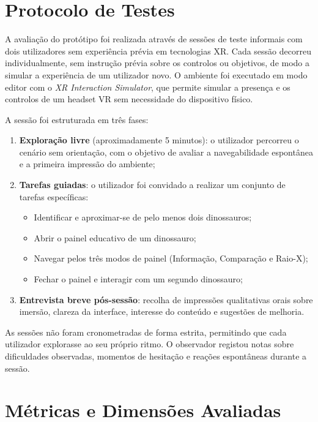 \documentclass[a4paper,11pt]{report}
\begin{document}
\section{Protocolo de Testes}

A avaliação do protótipo foi realizada através de sessões de teste informais
com dois utilizadores sem experiência prévia em tecnologias XR. Cada sessão
decorreu individualmente, sem instrução prévia sobre os controlos ou objetivos,
de modo a simular a experiência de um utilizador novo. O ambiente foi executado
em modo editor com o \textit{XR Interaction Simulator}, que permite simular
a presença e os controlos de um headset VR sem necessidade do dispositivo físico.

A sessão foi estruturada em três fases:

\begin{enumerate}
    \setlength\itemsep{0pt}
    \item \textbf{Exploração livre} (aproximadamente 5 minutos): o utilizador
          percorreu o cenário sem orientação, com o objetivo de avaliar a
          navegabilidade espontânea e a primeira impressão do ambiente;
    \item \textbf{Tarefas guiadas}: o utilizador foi convidado a realizar
          um conjunto de tarefas específicas:
          \begin{itemize}
              \setlength\itemsep{0pt}
              \item Identificar e aproximar-se de pelo menos dois dinossauros;
              \item Abrir o painel educativo de um dinossauro;
              \item Navegar pelos três modos de painel (Informação, Comparação
                    e Raio-X);
              \item Fechar o painel e interagir com um segundo dinossauro;
          \end{itemize}
    \item \textbf{Entrevista breve pós-sessão}: recolha de impressões
          qualitativas orais sobre imersão, clareza da interface, interesse
          do conteúdo e sugestões de melhoria.
\end{enumerate}

As sessões não foram cronometradas de forma estrita, permitindo que cada
utilizador explorasse ao seu próprio ritmo. O observador registou notas sobre
dificuldades observadas, momentos de hesitação e reações espontâneas durante
a sessão.

\section{Métricas e Dimensões Avaliadas}
\end{document}
